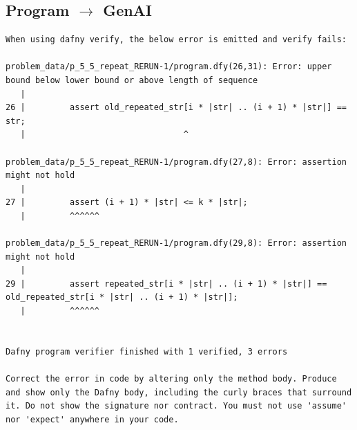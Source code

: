 \documentclass{article}
\begin{document}
\subsection*{Program $\rightarrow$ GenAI}
\begin{lstlisting}
When using dafny verify, the below error is emitted and verify fails:

problem_data/p_5_5_repeat_RERUN-1/program.dfy(26,31): Error: upper bound below lower bound or above length of sequence
   |
26 |         assert old_repeated_str[i * |str| .. (i + 1) * |str|] == str;
   |                                ^

problem_data/p_5_5_repeat_RERUN-1/program.dfy(27,8): Error: assertion might not hold
   |
27 |         assert (i + 1) * |str| <= k * |str|;
   |         ^^^^^^

problem_data/p_5_5_repeat_RERUN-1/program.dfy(29,8): Error: assertion might not hold
   |
29 |         assert repeated_str[i * |str| .. (i + 1) * |str|] == old_repeated_str[i * |str| .. (i + 1) * |str|];
   |         ^^^^^^


Dafny program verifier finished with 1 verified, 3 errors

Correct the error in code by altering only the method body. Produce and show only the Dafny body, including the curly braces that surround it. Do not show the signature nor contract. You must not use 'assume' nor 'expect' anywhere in your code.
\end{lstlisting}
\end{document}
